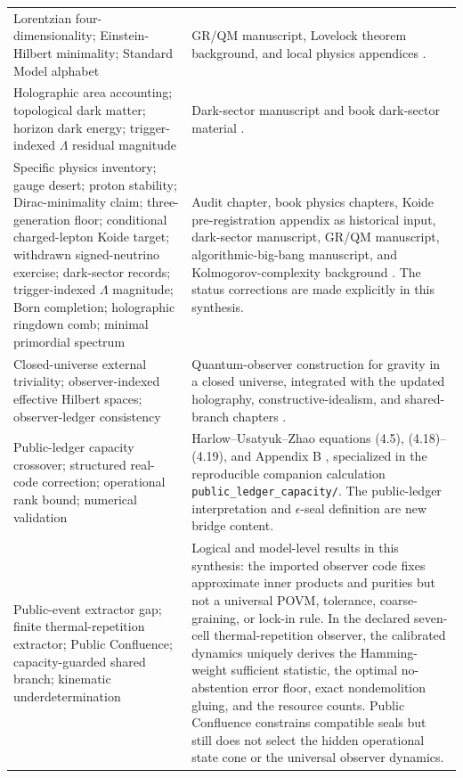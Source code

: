 \documentclass[11pt]{article}
\theoremstyle{plain}
\theoremstyle{definition}
\theoremstyle{remark}
\begin{document}
\begin{longtable}{@{}>{\raggedright\arraybackslash}p{}>{\raggedright\arraybackslash}p{}@{}}
Lorentzian four-dimensionality; Einstein-Hilbert minimality; Standard Model alphabet
& GR/QM manuscript, Lovelock theorem background, and local physics appendices \cite{lande-grqm,lovelock,lande-book-appendices}. \\
Holographic area accounting; topological dark matter; horizon dark energy; trigger-indexed \(\Lambda\) residual magnitude
& Dark-sector manuscript and book dark-sector material \cite{lande-dark,lande-book-appendices}. \\
Specific physics inventory; gauge desert; proton stability; Dirac-minimality claim; three-generation floor; conditional charged-lepton Koide target; withdrawn signed-neutrino exercise; dark-sector records; trigger-indexed \(\Lambda\) magnitude; Born completion; holographic ringdown comb; minimal primordial spectrum
& Audit chapter, book physics chapters, Koide pre-registration appendix as historical input, dark-sector manuscript, GR/QM manuscript, algorithmic-big-bang manuscript, and Kolmogorov-complexity background \cite{lande-audit,lande-book-appendices,lande-koide,lande-dark,lande-grqm,lande-bigbang,li-vitanyi}. The status corrections are made explicitly in this synthesis. \\
Closed-universe external triviality; observer-indexed effective Hilbert spaces; observer-ledger consistency
& Quantum-observer construction for gravity in a closed universe, integrated with the updated holography, constructive-idealism, and shared-branch chapters \cite{harlow-observers,lande-book-appendices}. \\
Public-ledger capacity crossover; structured real-code correction; operational rank bound; numerical validation
& Harlow--Usatyuk--Zhao equations (4.5), (4.18)--(4.19), and Appendix B \cite{harlow-observers}, specialized in the reproducible companion calculation \texttt{public\_ledger\_capacity/}. The public-ledger interpretation and \(\epsilon\)-seal definition are new bridge content. \\
Public-event extractor gap; finite thermal-repetition extractor; Public Confluence; capacity-guarded shared branch; kinematic underdetermination
& Logical and model-level results in this synthesis: the imported observer code fixes approximate inner products and purities but not a universal POVM, tolerance, coarse-graining, or lock-in rule. In the declared seven-cell thermal-repetition observer, the calibrated dynamics uniquely derives the Hamming-weight sufficient statistic, the optimal no-abstention error floor, exact nondemolition gluing, and the resource counts. Public Confluence constrains compatible seals but still does not select the hidden operational state cone or the universal observer dynamics. \\

\end{longtable}
\end{document}
